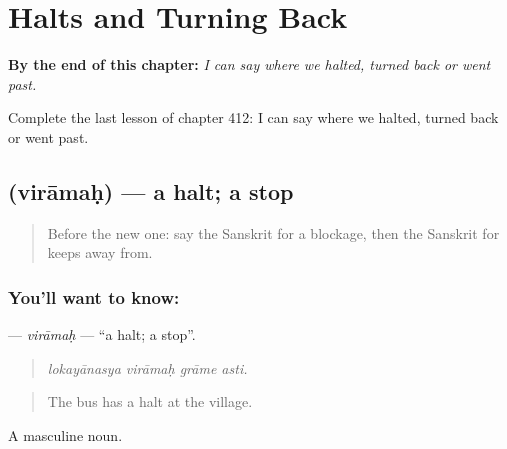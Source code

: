 
\chapter{Halts and Turning Back}
\label{ch:sa-halts-and-turning-back}

\begin{chapteropening}
\textbf{By the end of this chapter:} \emph{I can say where we halted, turned back or went past.}

Complete the last lesson of chapter 412: I can say where we halted, turned back or went past.
\end{chapteropening}

\section[\texorpdfstring{\sk{विरामः} (virāmaḥ)}{विरामः (virāmaḥ)}]{ (virāmaḥ) — a halt; a stop}

\label{lesson:SA-C412-viramah}



\begin{quote}
Before the new one: say the Sanskrit for a blockage, then the Sanskrit for keeps away from.
\end{quote}

\subsection*{You'll want to know: }
\textbf{} — \emph{virāmaḥ} — \textquotedblleft{}a halt; a stop\textquotedblright{}.

\begin{quote}
   
\end{quote}

\begin{quote}
\emph{lokayānasya virāmaḥ grāme asti.}
\end{quote}

\begin{quote}
The bus has a halt at the village.
\end{quote}

A masculine noun.

